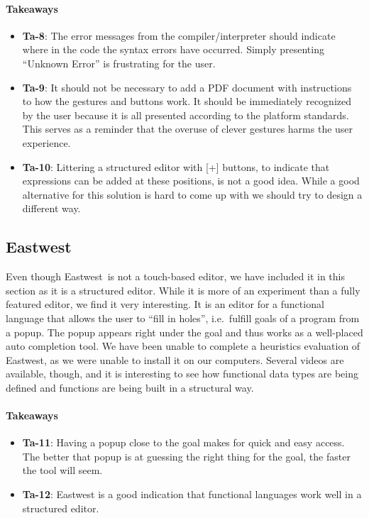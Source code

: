 \paragraph{Takeaways}
\begin{itemize}
	\item \textbf{Ta-8}: The error messages from the compiler/interpreter should indicate where in the code the syntax errors have occurred. Simply presenting ``Unknown Error'' is frustrating for the user.
	\item \textbf{Ta-9}: It should not be necessary to add a PDF document with instructions to how the gestures and buttons work. It should be immediately recognized by the user because it is all presented according to the platform standards. This serves as a reminder that the overuse of clever gestures harms the user experience.
	\item \textbf{Ta-10}: Littering a structured editor with [+] buttons, to indicate that expressions can be added at these positions, is not a good idea. While a good alternative for this solution is hard to come up with we should try to design a different way.
\end{itemize}

\subsection{Eastwest}
\label{subsub:Eastwest}
Even though Eastwest\,\cite{eastwest} is not a touch-based editor, we have included it in this section as it is a structured editor. 
While it is more of an experiment than a fully featured editor, we find it very interesting. It is an editor for a functional language that allows the user to ``fill in holes'', i.e.\ fulfill goals of a program from a popup. The popup appears right under the goal and thus works as a well-placed auto completion tool. We have been unable to complete a heuristics evaluation of Eastwest, as we were unable to install it on our computers. Several videos are available, though, and it is interesting to see how functional data types are being defined and functions are being built in a structural way.

\paragraph{Takeaways}
\begin{itemize}
	\item \textbf{Ta-11}: Having a popup close to the goal makes for quick and easy access. The better that popup is at guessing the right thing for the goal, the faster the tool will seem.
	\item \textbf{Ta-12}: Eastwest is a good indication that functional languages work well in a structured editor.
\end{itemize}


